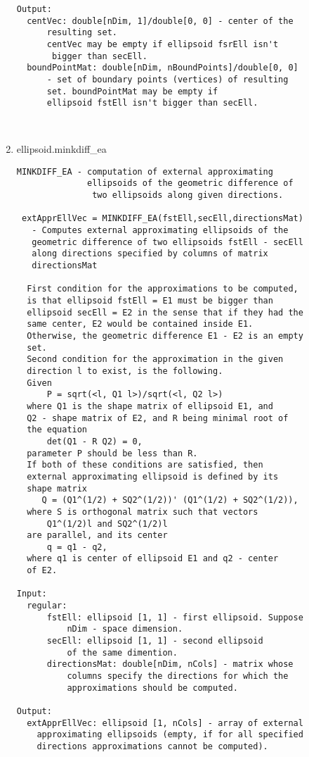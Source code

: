 \begin{enumerate}
\begin{lstlisting}
Output:
  centVec: double[nDim, 1]/double[0, 0] - center of the
      resulting set.
      centVec may be empty if ellipsoid fsrEll isn't
       bigger than secEll.
  boundPointMat: double[nDim, nBoundPoints]/double[0, 0]
      - set of boundary points (vertices) of resulting
      set. boundPointMat may be empty if
      ellipsoid fstEll isn't bigger than secEll.



\end{lstlisting}
\fontfamily{\familydefault}
\selectfont
\item {ellipsoid.minkdiff\_ea}
\selectfont
\begin{lstlisting}
MINKDIFF_EA - computation of external approximating
              ellipsoids of the geometric difference of
               two ellipsoids along given directions.

 extApprEllVec = MINKDIFF_EA(fstEll,secEll,directionsMat)
   - Computes external approximating ellipsoids of the
   geometric difference of two ellipsoids fstEll - secEll
   along directions specified by columns of matrix
   directionsMat

  First condition for the approximations to be computed,
  is that ellipsoid fstEll = E1 must be bigger than
  ellipsoid secEll = E2 in the sense that if they had the
  same center, E2 would be contained inside E1.
  Otherwise, the geometric difference E1 - E2 is an empty
  set.
  Second condition for the approximation in the given
  direction l to exist, is the following.
  Given
      P = sqrt(<l, Q1 l>)/sqrt(<l, Q2 l>)
  where Q1 is the shape matrix of ellipsoid E1, and
  Q2 - shape matrix of E2, and R being minimal root of
  the equation
      det(Q1 - R Q2) = 0,
  parameter P should be less than R.
  If both of these conditions are satisfied, then
  external approximating ellipsoid is defined by its
  shape matrix
     Q = (Q1^(1/2) + SQ2^(1/2))' (Q1^(1/2) + SQ2^(1/2)),
  where S is orthogonal matrix such that vectors
      Q1^(1/2)l and SQ2^(1/2)l
  are parallel, and its center
      q = q1 - q2,
  where q1 is center of ellipsoid E1 and q2 - center
  of E2.

Input:
  regular:
      fstEll: ellipsoid [1, 1] - first ellipsoid. Suppose
          nDim - space dimension.
      secEll: ellipsoid [1, 1] - second ellipsoid
          of the same dimention.
      directionsMat: double[nDim, nCols] - matrix whose
          columns specify the directions for which the
          approximations should be computed.

Output:
  extApprEllVec: ellipsoid [1, nCols] - array of external
    approximating ellipsoids (empty, if for all specified
    directions approximations cannot be computed).


\end{lstlisting}
\end{enumerate}
